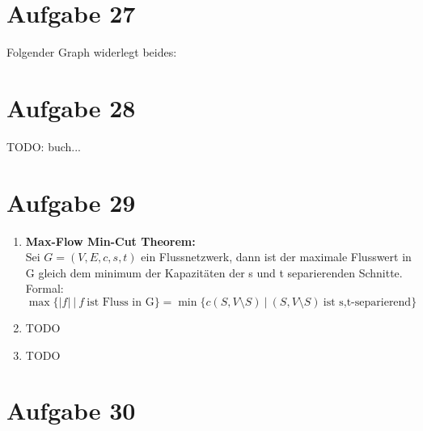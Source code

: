 \documentclass[10pt,a4paper]{article}
\begin{document}
\section*{Aufgabe 27}

    Folgender Graph widerlegt beides:
     \begin{figure}[!htb]
        \centering
    \end{figure}
    
\section*{Aufgabe 28}

TODO: buch...

\section*{Aufgabe 29}

    \begin{enumerate}[label={\alph*)}]
        \item \textbf{Max-Flow Min-Cut Theorem:}
            \\ Sei $G=(V,E,c,s,t)$ ein Flussnetzwerk, dann ist der maximale Flusswert in G gleich dem
                minimum der Kapazitäten der s und t separierenden Schnitte. Formal:
                $$
                    \max\{|f| \: |\: f \: \text{ist Fluss in G} \} = \min\{c(S,V \setminus S)\: |\: (S,V \setminus S) \:\text{ist s,t-separierend} \}
                $$
        \item TODO
        \item TODO
  
    \end{enumerate}

\section*{Aufgabe 30}
\end{document}
